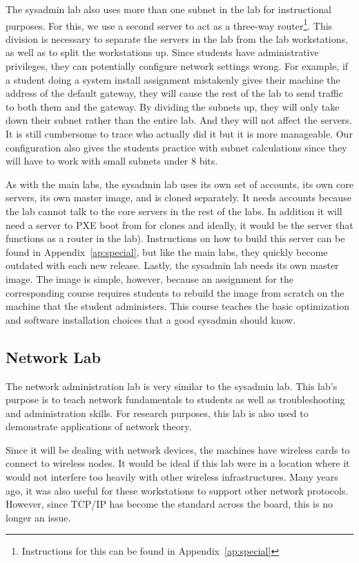 The sysadmin lab also uses more than one subnet in the lab for instructional purposes.  For this, we use a second server to act as a three-way router\footnote{Instructions for this can be found in Appendix~\ref{ap:special}}.  This division is necessary to separate the servers in the lab from the lab workstations, as well as to split the workstations up.  Since students have administrative privileges, they can potentially configure network settings wrong.  For example, if a student doing a system install assignment mistakenly gives their machine the address of the default gateway, they will cause the rest of the lab to send traffic to both them and the gateway.  By dividing the subnets up, they will only take down their subnet rather than the entire lab.  And they will not affect the servers.  It is still cumbersome to trace who actually did it but it is more manageable.  Our configuration also gives the students practice with subnet calculations since they will have to work with small subnets under 8 bits.

As with the main labs, the sysadmin lab uses its own set of accounts, its own core servers, its own master image, and is cloned separately.  It needs accounts because the lab cannot talk to the core servers in the rest of the labs.  In addition it will need a server to PXE boot from for clones and ideally, it would be the server that functions as a router in the lab).  Instructions on how to build this server can be found in Appendix~\ref{ap:special}, but like the main labs, they quickly become outdated with each new release.  Lastly, the sysadmin lab needs its own master image.  The image is simple, however, because an assignment for the corresponding course requires students to rebuild the image from scratch on the machine that the student administers.  This course teaches the basic optimization and software installation choices that a good sysadmin should know.  

\subsection{Network Lab}
The network administration lab is very similar to the sysadmin lab.  This lab's purpose is to teach network fundamentals to students as well as troubleshooting and administration skills.  For research purposes, this lab is also used to demonstrate applications of network theory.  

Since it will be dealing with network devices, the machines have wireless cards to connect to wireless nodes.  It would be ideal if this lab were in a location where it would not interfere too heavily with other wireless infrastructures.  Many years ago, it was also useful for these workstations to support other network protocols.  However, since TCP/IP has become the standard across the board, this is no longer an issue.  


